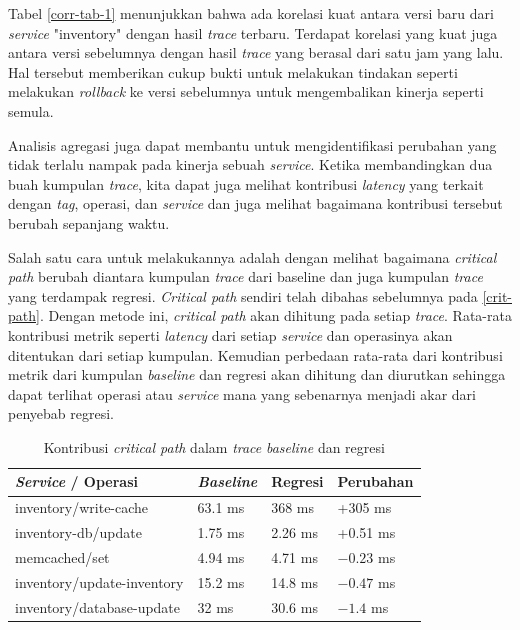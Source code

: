 Tabel \ref{corr-tab-1} menunjukkan bahwa ada korelasi kuat antara versi baru dari \textit{service} "inventory" dengan hasil \textit{trace} terbaru. Terdapat korelasi yang kuat juga antara versi sebelumnya dengan hasil \textit{trace} yang berasal dari satu jam yang lalu. Hal tersebut memberikan cukup bukti untuk melakukan tindakan seperti melakukan \textit{rollback} ke versi sebelumnya untuk mengembalikan kinerja seperti semula.

Analisis agregasi juga dapat membantu untuk mengidentifikasi perubahan yang tidak terlalu nampak pada kinerja sebuah \textit{service}. Ketika membandingkan dua buah kumpulan \textit{trace}, kita dapat juga melihat kontribusi \textit{latency} yang terkait dengan \textit{tag}, operasi, dan \textit{service} dan juga melihat bagaimana kontribusi tersebut berubah sepanjang waktu.

Salah satu cara untuk melakukannya adalah dengan melihat bagaimana \textit{critical path} berubah diantara kumpulan \textit{trace} dari baseline dan juga kumpulan \textit{trace} yang terdampak regresi. \textit{Critical path} sendiri telah dibahas sebelumnya pada \ref{crit-path}. Dengan metode ini, \textit{critical path} akan dihitung pada setiap \textit{trace}. Rata-rata kontribusi metrik seperti \textit{latency} dari setiap \textit{service} dan operasinya akan ditentukan dari setiap kumpulan. Kemudian perbedaan rata-rata dari kontribusi metrik dari kumpulan \textit{baseline} dan regresi akan dihitung dan diurutkan sehingga dapat terlihat operasi atau \textit{service} mana yang sebenarnya menjadi akar dari penyebab regresi.
\begin{small}
	\begin{longtable}{ | p{5cm} | p{2cm} | p{2cm} | p{2cm} | }
		\caption{Kontribusi \textit{critical path} dalam \textit{trace} \textit{baseline} dan regresi}
		\label{corr-tab-2}                                                           
		\\ \hline
		\centering\bfseries{\textit{Service} / Operasi} & \centering\bfseries{\textit{Baseline}} & \centering\bfseries{Regresi} & \centering\bfseries{Perubahan} \tabularnewline \hline
		\endfirsthead
		inventory/write-cache & 63.1 ms & 368 ms & +305 ms \\ \hline
		inventory-db/update & 1.75 ms & 2.26 ms & +0.51 ms \\ \hline
		memcached/set & 4.94 ms & 4.71 ms & $\num{-0.23}$ ms \\ \hline
		inventory/update-inventory & 15.2 ms & 14.8 ms & $\num{-0.47}$ ms \\ \hline
		inventory/database-update & 32 ms & 30.6 ms & $\num{-1.4}$ ms \\ \hline
	\end{longtable}
\end{small}

